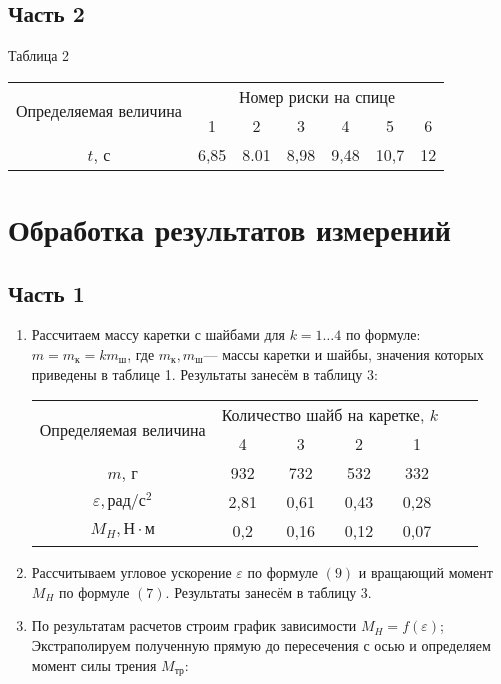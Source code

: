 \documentclass[12pt]{article}
\begin{document}
\subsection*{Часть 2}
\begin{table}[h!]
\begin{center}
Таблица 2

\begin{tabular}{|c|c|c|c|c|c|c|}
\hline
\multirow{2}{*}{Определяемая величина} & \multicolumn{6}{c|}{Номер риски на спице} \\
\hhline{~------}
 &1  & 2&3&	4&5&6	
  \\\hline

$t$, с &   6,85&	8.01&	8,98	&9,48	&10,7&	12\\

\hline
\end{tabular}
\end{center}
\end{table} 
\newpage
\section*{Обработка результатов измерений}
\subsection*{Часть 1}
\begin{enumerate}
\item	Рассчитаем массу каретки с шайбами для $k = 1…4$ по формуле: $m=m_{к} = km_{ш}$, где $m_{к}, m_{ш} $--- массы каретки и шайбы, значения которых приведены в таблице 1. Результаты занесём в таблицу 3: 
\begin{table}[h!]
\begin{center}
\begin{tabular}{|c|c|c|c|c|c|c|}
\hline
\multirow{2}{*}{Определяемая величина} & \multicolumn{4}{c|}{Количество шайб на каретке, $k$} \\
\hhline{~----}
 &4  & 3&2&	1	 \\\hline

$m$, г &  932	&732&	532	&332\\
\hline
$\varepsilon, рад/с^2$ & 2,81&	0,61	&0,43&	0,28\\
\hline
$M_{H}, Н\cdot м$ &   0,2	&0,16	&0,12&	0,07\\
\hline
\end{tabular}
\end{center}
\end{table} 
\item Рассчитываем угловое ускорение $\varepsilon$ по формуле $(9)$ и вращающий момент $M_{H}$ по формуле $(7)$. Результаты занесём в таблицу 3.
\item По результатам расчетов строим график зависимости $M_{H}=f(\varepsilon)$; Экстраполируем полученную прямую до пересечения с осью и определяем момент силы трения $M_{тр}$:

\end{enumerate}
\newpage
\end{document}
